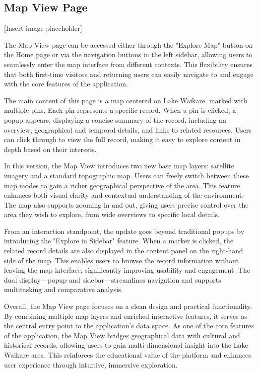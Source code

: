 \subsection{Map View Page}
[Insert image placeholder]

The Map View page can be accessed either through the "Explore Map" button on the Home page or via the navigation buttons in the left sidebar, allowing users to seamlessly enter the map interface from different contexts. This flexibility ensures that both first-time visitors and returning users can easily navigate to and engage with the core features of the application.

The main content of this page is a map centered on Lake Waikare, marked with multiple pins. Each pin represents a specific record. When a pin is clicked, a popup appears, displaying a concise summary of the record, including an overview, geographical and temporal details, and links to related resources. Users can click through to view the full record, making it easy to explore content in depth based on their interests.

In this version, the Map View introduces two new base map layers: satellite imagery and a standard topographic map. Users can freely switch between these map modes to gain a richer geographical perspective of the area. This feature enhances both visual clarity and contextual understanding of the environment. The map also supports zooming in and out, giving users precise control over the area they wish to explore, from wide overviews to specific local details.

From an interaction standpoint, the update goes beyond traditional popups by introducing the "Explore in Sidebar" feature. When a marker is clicked, the related record details are also displayed in the content panel on the right-hand side of the map. This enables users to browse the record information without leaving the map interface, significantly improving usability and engagement. The dual display—popup and sidebar—streamlines navigation and supports multitasking and comparative analysis.

Overall, the Map View page focuses on a clean design and practical functionality. By combining multiple map layers and enriched interactive features, it serves as the central entry point to the application's data space. As one of the core features of the application, the Map View bridges geographical data with cultural and historical records, allowing users to gain multi-dimensional insight into the Lake Waikare area. This reinforces the educational value of the platform and enhances user experience through intuitive, immersive exploration.

